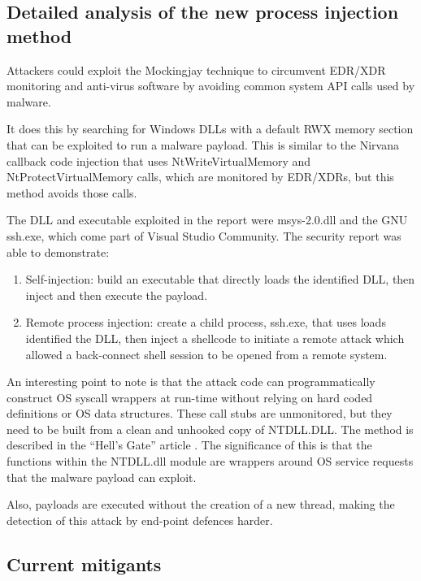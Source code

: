 \subsection{Detailed analysis of the new process injection method}

Attackers could exploit the Mockingjay technique to circumvent EDR/XDR monitoring and anti-virus software by avoiding
common system API calls used by malware.

It does this by searching for Windows DLLs with a default RWX memory section that can be exploited to run a malware payload.
This is similar to the Nirvana callback code injection that uses NtWriteVirtualMemory and NtProtectVirtualMemory calls, which are
monitored by EDR/XDRs,  but this method avoids those calls.

The DLL and executable exploited in the report were msys-2.0.dll and the GNU ssh.exe, which come part of Visual Studio Community.
The security report was able to demonstrate:

\begin{enumerate}
\item Self-injection: build an executable that directly loads the identified DLL, then inject and then execute the payload. 
\item Remote process injection: create a child process, ssh.exe, that uses loads identified the DLL, then inject a shellcode to initiate
  a remote attack which allowed a back-connect shell session to be opened from a remote system.
\end{enumerate}

An interesting point to note is that the attack code can programmatically construct OS syscall wrappers at run-time without relying
on hard coded definitions or OS data structures.
These call stubs are unmonitored, but they need to be built from a clean and unhooked copy of NTDLL.DLL.
The method is described in the ``Hell's Gate'' article \autocite{smellyvx:2021}.
The significance of this is that the functions within the NTDLL.dll module are wrappers around OS service requests that
the malware payload can exploit. 

Also, payloads are executed without the creation of a new thread, making the detection of this attack by end-point defences harder.


\subsection{Current mitigants}

